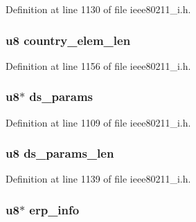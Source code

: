Definition at line 1130 of file ieee80211\-\_\-i.\-h.

\hypertarget{structieee802__11__elems_ae24d95c5691f6017fcbfd8f7a5933990}{
\subsubsection[{country\-\_\-elem\-\_\-len}]{\setlength{\rightskip}{0pt plus 5cm}u8 country\-\_\-elem\-\_\-len}}\label{structieee802__11__elems_ae24d95c5691f6017fcbfd8f7a5933990}


Definition at line 1156 of file ieee80211\-\_\-i.\-h.

\hypertarget{structieee802__11__elems_ac2f2349fb1f40ffc5e91ec3ad5fe678f}{
\subsubsection[{ds\-\_\-params}]{\setlength{\rightskip}{0pt plus 5cm}u8$\ast$ ds\-\_\-params}}\label{structieee802__11__elems_ac2f2349fb1f40ffc5e91ec3ad5fe678f}


Definition at line 1109 of file ieee80211\-\_\-i.\-h.

\hypertarget{structieee802__11__elems_a85a3203b26546e19531ab204d6cf2b7f}{
\subsubsection[{ds\-\_\-params\-\_\-len}]{\setlength{\rightskip}{0pt plus 5cm}u8 ds\-\_\-params\-\_\-len}}\label{structieee802__11__elems_a85a3203b26546e19531ab204d6cf2b7f}


Definition at line 1139 of file ieee80211\-\_\-i.\-h.

\hypertarget{structieee802__11__elems_a5afa785c397a503afdef4c895bf319d6}{
\subsubsection[{erp\-\_\-info}]{\setlength{\rightskip}{0pt plus 5cm}u8$\ast$ erp\-\_\-info}}\label{structieee802__11__elems_a5afa785c397a503afdef4c895bf319d6}


